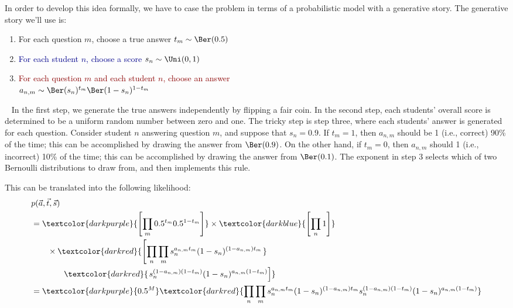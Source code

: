 In order to develop this idea formally, we have to case the problem in terms of a probabilistic model with a generative story.
The generative story we'll use is:
%
\begin{enumerate}
  \item \textcolor{darkpurple}{For each question $m$, choose a true answer $t_m \sim \Ber(0.5)$}
  \item \textcolor{darkblue}{For each student $n$, choose a score $s_n \sim \Uni(0,1)$}
  \item \textcolor{darkred}{For each question $m$ and each student $n$, choose an answer\\ $a_{n,m} \sim \Ber(s_n)^{t_m}  \Ber(1-s_n)^{1-t_m}$}
\end{enumerate}
~
In the first step, we generate the true answers independently by flipping a fair coin.
In the second step, each students' overall score is determined to be a uniform random number between zero and one.
The tricky step is step three, where each students' answer is generated for each question.
Consider student $n$ answering question $m$, and suppose that $s_n = 0.9$.
If $t_m = 1$, then $a_{n,m}$ should be 1 (i.e., correct) 90\% of the time;
this can be accomplished by drawing the answer from $\Ber(0.9)$.
On the other hand, if $t_m = 0$, then $a_{n,m}$ should 1 (i.e., incorrect) 10\% of the time;
this can be accomplished by drawing the answer from $\Ber(0.1)$.
The exponent in step 3 selects which of two Bernoulli distributions to draw from, and then implements this rule.

This can be translated into the following likelihood:
~
\begin{align}
  &p(\vec a, \vec t, \vec s) \nonumber\\
  &=      \textcolor{darkpurple}{\left[ \prod_m 0.5^{t_m} 0.5^{1-t_m} \right]} \times
            \textcolor{darkblue}{\left[ \prod_n 1 \right]} \nonumber\\
  &\qquad \times    \textcolor{darkred}{\left[ \prod_n\prod_m
    s_n^{a_{n,m}t_m}
    (1-s_n)^{(1-a_{n,m})t_m} \right.} \nonumber\\
  &\qquad\qquad\textcolor{darkred}{\left. s_n^{(1-a_{n,m})(1-t_m)}
    (1-s_n)^{a_{n,m}(1-t_m)}
    \right]} \\
 &= \textcolor{darkpurple}{0.5^M}
   \textcolor{darkred}{
\prod_n\prod_m
    s_n^{a_{n,m}t_m}
    (1-s_n)^{(1-a_{n,m})t_m}
   s_n^{(1-a_{n,m})(1-t_m)}
    (1-s_n)^{a_{n,m}(1-t_m)}
   }
\end{align}


